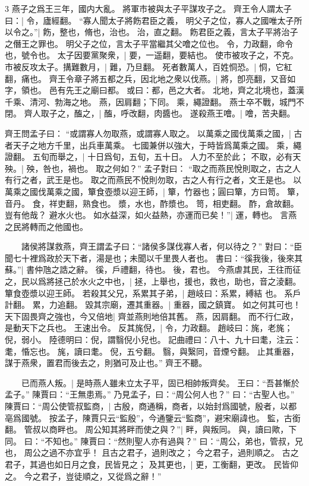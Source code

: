 3 燕子之爲王三年，國内大亂。
  將軍市被與太子平謀攻子之。
  齊王令人謂太子曰：|{
	令，廬經翻。
}
“寡人聞太子將飭君臣之義，
明父子之位，寡人之國唯太子所以令之。”|{
	飭，整也，脩也，治也。
	治，直之翻。
	飭君臣之義，言太子平將治子之僭王之罪也。
	明父子之位，言太子平當繼其父噲之位也。
	令，力政翻，命令也，號令也。
}
太子因要黨聚衆，|{
	要，一遥翻，要結也。
}
使市被攻子之，不克。市被反攻太子。搆難數月，|{
	難，乃旦翻。
}
死者數萬人，百姓恫恐。|{
	恫，它紅翻，痛也。
}
齊王令章子將五都之兵，因北地之衆以伐燕。|{
	將，卽亮翻，又音如字，領也。
	邑有先王之廟曰都。
	或曰：都，邑之大者。
	北地，齊之北境也，蓋漢千乘、清河、勃海之地。
	燕，因肩翻；下同。
	乘，繩證翻。
}
燕士卒不戰，城門不閉。
	齊人取子之，醢之，|{
	醢，呼改翻，肉醬也。
}
遂殺燕王噲。|{
	噲，苦夬翻。
}

齊王問孟子曰：
“或謂寡人勿取燕，或謂寡人取之。
	以萬乘之國伐萬乘之國，|{
	古者天子之地方千里，出兵車萬乘。
	七國兼併以強大，于時皆爲萬乘之國。
	乘，繩證翻。
}
五旬而舉之，|{
	十日爲旬，五旬，五十日。
}
人力不至於此；
不取，必有天殃。|{
	殃，咎也，禍也。
}
取之何如？”
孟子對曰：
“取之而燕民悅則取之，古之人有行之者，武王是也。
	取之而燕民不悅則勿取，古之人有行之者，文王是也。
	以萬乘之國伐萬乘之國，簞食壺漿以迎王師，|{
	簞，竹器也；圓曰簞，方曰笥。
	簞，音丹。
	食，祥吏翻，熟食也。
	漿，水也，酢漿也。
	笥，相吏翻。
	酢，倉故翻。
}
豈有他哉？
避水火也。
如水益深，如火益熱，亦運而已矣！”|{
	運，轉也。
	言燕之民將轉而之他國也。
}

　　諸侯將謀救燕，齊王謂孟子曰：“諸侯多謀伐寡人者，何以待之？”
對曰：“臣聞七十裡爲政於天下者，湯是也；未聞以千里畏人者也。
	書曰：“徯我後，後來其蘇。”|{
	書仲虺之誥之辭。
	徯，戶禮翻，待也。
	後，君也。
}
今燕虐其民，王往而征之，民以爲將拯己於水火之中也，|{
	拯，上舉也，援也，救也，助也，音之淩翻。
}
簞食壺漿以迎王師。
	若殺其父兄，系累其子弟，|{
	趙岐曰：系累，縛結 也。
	系戶計翻。
	累，力追翻。
}
毀其宗廟，遷其重器。|{
	重器，國之鎮寶。
}
如之何其可也！天下固畏齊之強也，今又倍地|{
	齊並燕則地倍其舊。
	燕，因肩翻。
}
而不行仁政，是動天下之兵也。
	王速出令。
	反其旄倪，|{
	令，力政翻。
	趙岐曰：旄，老旄；倪，弱小。
	陸德明曰：倪，謂翳倪小兒也。
	記曲禮曰：八十、九十曰耄，注云：耄，惛忘也。
	旄，讀曰耄。
	倪，五兮翻。
	翳，與繄同，音煙兮翻。
}
止其重器，謀于燕衆，置君而後去之，則猶可及止也。”
齊王不聽。


　　已而燕人叛。|{
	是時燕人雖未立太子平，固已相帥叛齊矣。
}
王曰：“吾甚慚於孟子。”
陳賈曰：“王無患焉。”
乃見孟子，曰：“周公何人也？”
曰：“古聖人也。”
陳賈曰：“周公使管叔監商，|{
	古殷，商通稱，商者，以始封爲國號，殷者，以都亳爲國號。
	按孟子，陳賈只云“監殷”，今通鑒云“監商”，避宋廟諱也。
	監，古銜翻。
}
管叔以商畔也。
	周公知其將畔而使之與？”|{
	畔，與叛同。
	與，讀曰歟，下同。
}
曰：“不知也。”
陳賈曰：“然則聖人亦有過與？”
曰：“周公，弟也，管叔，兄也，
	周公之過不亦宜乎！
	且古之君子，過則改之；
	今之君子，過則順之。
	古之君子，其過也如日月之食，民皆見之；
	及其更也，|{
	更，工衡翻，更改。
}
	民皆仰之。
	今之君子，豈徒順之，又從爲之辭！”

